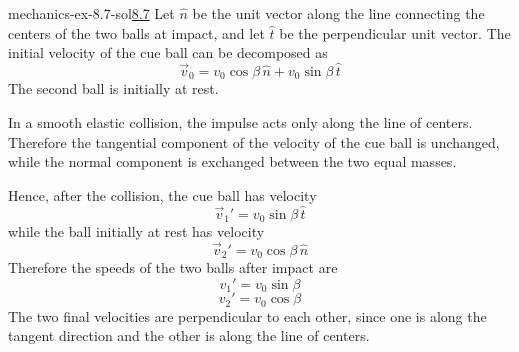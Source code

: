 \documentclass[preview]{standalone}
\begin{document}
\begin{snippetsolution}{mechanics-ex-8.7-sol}{\underline{8.7}}
    Let \(\hat n\) be the unit vector along the line connecting the centers of the
    two balls at impact, and let \(\hat t\) be the perpendicular unit vector. The
    initial velocity of the cue ball can be decomposed as
    \[
        \vec v_0 = v_0\cos\beta\,\hat n + v_0\sin\beta\,\hat t
    \]
    The second ball is initially at rest.

    In a smooth elastic collision, the impulse acts only along the line of centers.
    Therefore the tangential component of the velocity of the cue ball is unchanged,
    while the normal component is exchanged between the two equal masses.

    Hence, after the collision, the cue ball has velocity
    \[
        \vec v_1' = v_0\sin\beta\,\hat t
    \]
    while the ball initially at rest has velocity
    \[
        \vec v_2' = v_0\cos\beta\,\hat n
    \]
    Therefore the speeds of the two balls after impact are
    \[
        v_1' = v_0\sin\beta
    \]
    \[
        v_2' = v_0\cos\beta
    \]
    The two final velocities are perpendicular to each other, since one is along
    the tangent direction and the other is along the line of centers.
\end{snippetsolution}
\end{document}
